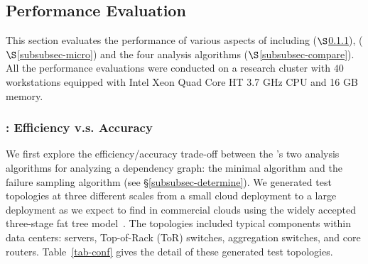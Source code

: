 

\subsection{Performance Evaluation}
\label{subsec-perf}


This section evaluates the performance of various aspects of \app including
\sia ($\S$\ref{subsubsec-performance}),
\pia ($\S$\ref{subsubsec-micro})
and the four analysis algorithms ($\S$\ref{subsubsec-compare}).
All the performance evaluations were conducted on a research
cluster with $40$ workstations
equipped with Intel Xeon Quad Core HT 3.7 GHz CPU 
and 16 GB memory.


\subsubsection{\sia: Efficiency v.s. Accuracy}
\label{subsubsec-performance}

We first explore the efficiency/accuracy 
trade-off between the \sia's
two analysis algorithms for analyzing a dependency graph:
the minimal \rg algorithm and 
the failure sampling algorithm (see \S\ref{subsubsec-determine}).
We generated test topologies at three different scales
from a small cloud deployment
to a large deployment as we expect to find in commercial clouds
using the widely accepted three-stage 
fat tree model~\cite{mysore09portland}.
The topologies included typical components within
data centers: servers, Top-of-Rack (ToR) switches,
aggregation switches, and core routers.
Table~\ref{tab-conf} gives the detail of these generated test topologies.


\begin{table}[tbp]
 	\caption{Configurations of our generated data sets.}
	\vspace{-0.2cm}
  \label{tab-conf}
\end{table}


